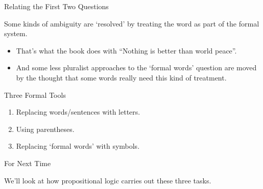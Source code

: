 \documentclass[
  ignorenonframetext,
]{beamer}
\providecommand{\tightlist}{%
  \setlength{\itemsep}{0pt}\setlength{\parskip}{0pt}}
\renewcommand{\,}{\text{, }}
\begin{document}
\begin{frame}{Relating the First Two Questions}
\protect\hypertarget{relating-the-first-two-questions}{}

Some kinds of ambiguity are `resolved' by treating the word as part of
the formal system.

\begin{itemize}
\tightlist
\item
  That's what the book does with ``Nothing is better than world peace''.
\item
  And some less pluralist approaches to the `formal words' question are
  moved by the thought that some words really need this kind of
  treatment.
\end{itemize}

\end{frame}

\begin{frame}{Three Formal Tools}
\protect\hypertarget{three-formal-tools}{}

\begin{enumerate}[<+->]
\tightlist
\item
  Replacing words/sentences with letters.
\item
  Using parentheses.
\item
  Replacing `formal words' with symbols.
\end{enumerate}

\end{frame}

\begin{frame}{For Next Time}
\protect\hypertarget{for-next-time}{}

We'll look at how propositional logic carries out these three tasks.

\end{frame}
\end{document}
